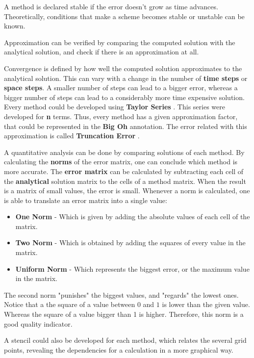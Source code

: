 \documentclass[12pt]{article}
\begin{document}
\par A method is declared stable if the error doesn't grow as time advances. Theoretically, conditions that make a scheme becomes stable or unstable can be known.
\par Approximation can be verified by comparing the computed solution with the analytical solution, and check if there is an approximation at all.
\par Convergence is defined by how well the computed solution approximates to the analytical solution. This can vary with a change in the number of \textbf{time steps} or \textbf{space steps}. A smaller number of steps can lead to a bigger error, whereas a bigger number of steps can lead to a considerably more time expensive solution. Every method could be developed using \textbf{Taylor Series} \cite{hoffman}. This series were developed for \textbf{n} terms. Thus, every method has a given approximation factor, that could be represented in the \textbf{Big Oh} annotation. The error related with this approximation is called \textbf{Truncation Error} \cite{numerical_analysis}.
\par A quantitative analysis can be done by comparing solutions of each method. By calculating the \textbf{norms} of the error matrix, one can conclude which method is more accurate. The \textbf{error matrix} can be calculated by subtracting each cell of the \textbf{analytical} solution matrix to the cells of a method matrix. When the result is a matrix of small values, the error is small. Whenever a norm is calculated, one is able to translate an error matrix into a single value:

\begin{itemize}[noitemsep] 
\item \textbf{One Norm} - Which is given by adding the absolute values of each cell of the matrix.
\item \textbf{Two Norm} - Which is obtained by adding the squares of every value in the matrix.
\item \textbf{Uniform Norm} - Which represents the biggest error, or the maximum value in the matrix.
\end{itemize}

The second norm "punishes" the biggest values, and "regards" the lowest ones. Notice that a the square of a value between $0$ and $1$ is lower than the given value. Whereas the square of a value bigger than 1 is higher. Therefore, this norm is a good quality indicator. 

\par A stencil could also be developed for each method, which relates the several grid points, revealing the dependencies for a calculation in a more graphical way. 
\end{document}
